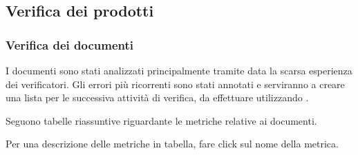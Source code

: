 			\subsection{Verifica dei prodotti}
				\subsubsection{Verifica dei documenti}
					I documenti sono stati analizzati principalmente tramite  data la scarsa esperienza dei verificatori. Gli errori più ricorrenti sono stati annotati e serviranno a creare una lista per le successiva attività di verifica, da effettuare utilizzando .		
					
					Seguono tabelle riassuntive riguardante le metriche relative ai documenti. 
					
					Per una descrizione delle metriche in tabella, fare click sul nome della metrica.
					
